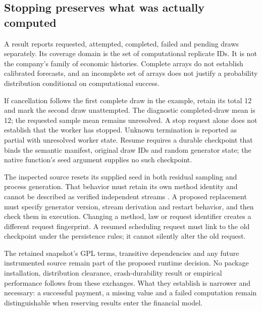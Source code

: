 \subsection{Stopping preserves what was actually computed}

A result reports requested, attempted, completed, failed and pending draws
separately. Its coverage domain is the set of computational replicate IDs.
It is not the company's family of economic histories. Complete arrays do
not establish calibrated forecasts, and an incomplete set of arrays does
not justify a probability distribution conditional on computational success.

If cancellation follows the first complete draw in the example, retain its
total 12 and mark the second draw unattempted. The diagnostic completed-draw
mean is 12; the requested sample mean remains unresolved. A stop request alone
does not establish that the worker has stopped. Unknown termination is
reported as partial with unresolved worker state. Resume requires a durable
checkpoint that binds the semantic manifest, original draw IDs and random
generator state; the native function's seed argument supplies no such
checkpoint.

The inspected source resets its supplied seed in both residual sampling and
process generation. That behavior must retain its own method identity and
cannot be described as verified independent streams
\citep[ and the process-law branches]{chainladder2023snapshot}.
A proposed replacement must specify generator version, stream derivation and
restart behavior, and then check them in execution. Changing a method, law or
request identifier creates a different request fingerprint. A resumed
scheduling request must link to the old checkpoint under the persistence
rules; it cannot silently alter the old request.

The retained snapshot's GPL terms, transitive dependencies and any future
instrumented source remain part of the proposed runtime decision. No package
installation, distribution clearance, crash-durability result or empirical
performance follows from these exchanges. What they establish is narrower
and necessary: a successful payment, a missing value and a failed computation
remain distinguishable when reserving results enter the financial model.
